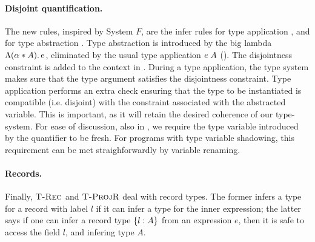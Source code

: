 \paragraph{Disjoint quantification.}
The new rules, inspired by System $F$, are the infer rules for type
application , and for type abstraction
.  Type abstraction is introduced by the big
lambda $\Lambda (\alpha* A).\, e$, eliminated by the usual type application
$e \; A$ ().  The disjointness constraint is
added to the context in . During a type application, the
type system makes sure that the type argument satisfies the
disjointness constraint.  Type application performs an extra check
ensuring that the type to be instantiated is compatible
(i.e. disjoint) with the constraint associated with the abstracted
variable.  This is important, as it will retain the desired coherence
of our type-system.  For ease of discussion, also in
, we require the type variable introduced by the
quantifier to be fresh.  For programs with type variable shadowing,
this requirement can be met straighforwardly by variable renaming.

\paragraph{Records.}
Finally, $\textsc{T-Rec}$ and $\textsc{T-ProjR}$ deal with record types.
The former infers a type for a record with label $l$ if it can infer a type for the
inner expression; the latter says if one can infer a record type $\{ l : A \}$ 
from an expression $e$, then it is safe to access the field $l$, and infering type $A$.

